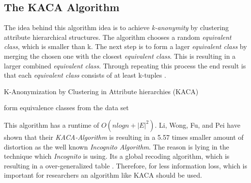 \documentclass{llncs}
\begin{document}
\subsection{The KACA Algorithm}
The idea behind this algorithm idea is to achieve \textit{k-anonymity} by clustering attribute hierarchical structures. The algorithm chooses a random \textit{equivalent class}, which is smaller than k. The next step is to form a lager \textit{equivalent class} by merging the chosen one with the closest \textit{equivalent class}. This is resulting in a larger combined \textit{equivalent class}. Through repeating this process the end result is that each \textit{equivalent class} consists of at least k-tuples \cite{li2006achieving}.\\
\begin{algorithm}[H]
	\caption{K-Anonymization by Clustering in Attribute hierarchies (KACA) \cite{li2006achieving}}
	form equivalence classes from the data set\\
\end{algorithm}
This algorithm has a runtime of $O(nlogn + |E|^{2})$. Li, Wong, Fu, and Pei have shown that their \textit{KACA-Algorithm} is resulting in a 5.57 times smaller amount of distortion as the well known \textit{Incognito Algorithm}. The reason is lying in the technique which \textit{Incognito} is using. Its a global recoding algorithm, which is resulting in a over-generalized table \cite{li2006achieving}. Therefore, for less information loss, which is important for researchers an algorithm like KACA should be used.
\end{document}
